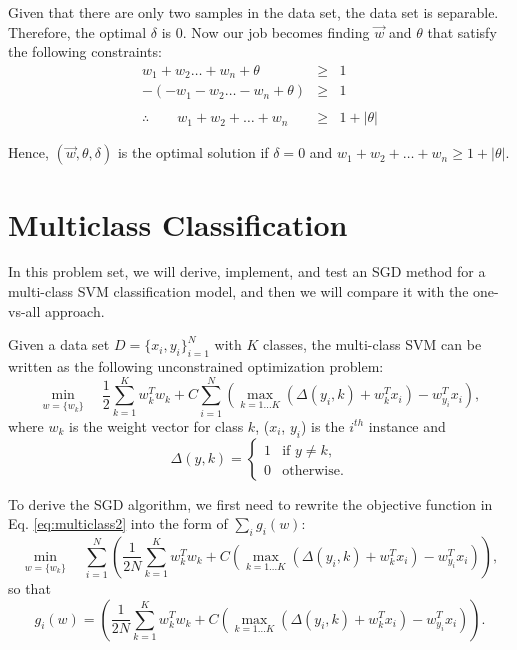 {
\color{red}
Given that there are only two samples in the data set, the data
      set is separable. Therefore, the optimal $\delta$ is 0. 
      Now our job becomes finding $\vec{w}$ and $\theta$ that satisfy the following constraints:
      \begin{eqnarray*}
        w_1 + w_2  \ldots +w_n  + \theta  & \geq & 1 \\
        -(-w_1 - w_2  \ldots -w_n  + \theta) & \geq & 1 \\
	& & \\
      \therefore \qquad 
        w_1 + w_2 + \ldots + w_n  & \geq & 1 + | \theta|
      \end{eqnarray*}
      
      Hence, $(\vec{w},\theta,\delta)$ is the optimal solution
      if $\delta = 0$ and $w_1 + w_2 + \ldots + w_n  \geq  1+ | \theta|$.    
}

\section{Multiclass Classification} 
In this problem set, we will derive, implement, and test an SGD method for a multi-class SVM classification model, and then we will compare it with the one-vs-all approach. 

Given a data set $D = \{x_i, y_i\}_{i=1}^N$ with $K$ classes, the multi-class SVM can be written as the following  unconstrained optimization problem:
\begin{equation}
\label{eq:multiclass2}
    \min_{w=\{w_k\}} \quad \frac{1}{2} \sum_{k=1}^K w_k^T w_k + C \sum_{i=1}^N \left( \max_{k=1\ldots K} \left(\Delta(y_i, k)+w_k^Tx_i\right)-w^T_{y_i} x_i\right),
\end{equation}
where  $w_k$ is the weight vector for class $k$, ($x_i$, $y_i$) is the $i^{th}$ instance and 
\begin{equation*}
\Delta(y,k) = 
    \begin{cases}
    1 & \mbox{if } y\neq k,\\
    0 & \mbox{otherwise}.
    \end{cases}
\end{equation*}

To derive the SGD  algorithm, we first need to rewrite the objective function in Eq. \eqref{eq:multiclass2} into the form of $\sum_i g_i(w)$:
\begin{equation*}
\label{eq:multiclass}
    \min_{w=\{w_k\}} \quad \sum^N_{i=1} \left(\frac{1}{2N} \sum^K_{k=1} w_k^T w_k + C  \left( \max_{k=1\ldots K} \left(\Delta(y_i, k)+w_k^Tx_i\right)-w^T_{y_i} x_i\right)\right),
\end{equation*}
so that 
\begin{equation*}
    g_i(w) =  \left(\frac{1}{2N} \sum^K_{k=1} w_k^T w_k + C  \left( \max_{k=1\ldots K} \left(\Delta(y_i, k)+w_k^Tx_i\right)-w^T_{y_i} x_i\right)\right). 
\end{equation*}

